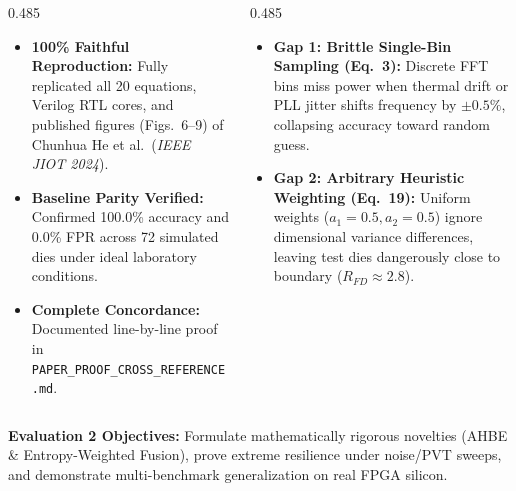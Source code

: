 \documentclass[aspectratio=169,11pt]{beamer}
\begin{document}
\begin{frame}[t]
  \vspace*{-0.18cm}

  \begin{columns}[T, onlytextwidth]
    \begin{column}{0.485\textwidth}
      \begin{glassbox}[top=2pt, bottom=2pt, left=6pt, right=6pt, title={Evaluation 1 Accomplishments (Recap)}]{}
        \begin{itemize}\setlength{\itemsep}{1.2pt}
          \item \textbf{100\% Faithful Reproduction:} Fully replicated all 20 equations, Verilog RTL cores, and published figures (Figs.\ 6--9) of Chunhua He et al.\ (\textit{IEEE JIOT 2024}).
          \item \textbf{Baseline Parity Verified:} Confirmed 100.0\% accuracy and 0.0\% FPR across 72 simulated dies under ideal laboratory conditions.
          \item \textbf{Complete Concordance:} Documented line-by-line proof in \texttt{PAPER\_PROOF\_CROSS\_REFERENCE.md}.
        \end{itemize}
      \end{glassbox}
    \end{column}

    \begin{column}{0.485\textwidth}
      \begin{glassbox}[top=2pt, bottom=2pt, left=6pt, right=6pt, title={Two Fatal Gaps Uncovered in Base Paper}]{}
        \begin{itemize}\setlength{\itemsep}{1.2pt}
          \item \textbf{Gap 1: Brittle Single-Bin Sampling (Eq.\ 3):}
            Discrete FFT bins miss power when thermal drift or PLL jitter shifts frequency by $\pm 0.5\%$, collapsing accuracy toward random guess.
          \item \textbf{Gap 2: Arbitrary Heuristic Weighting (Eq.\ 19):}
            Uniform weights ($a_1=0.5, a_2=0.5$) ignore dimensional variance differences, leaving test dies dangerously close to boundary ($R_{FD} \approx 2.8$).
        \end{itemize}
      \end{glassbox}
    \end{column}
  \end{columns}

  \vspace{0.04cm}
  \begin{glasscard}[top=2pt, bottom=2pt, left=6pt, right=6pt]
    \textbf{\color{textPrimary}Evaluation 2 Objectives:} Formulate mathematically rigorous novelties (AHBE \& Entropy-Weighted Fusion), prove extreme resilience under noise/PVT sweeps, and demonstrate multi-benchmark generalization on real FPGA silicon.
  \end{glasscard}
\end{frame}
\end{document}
